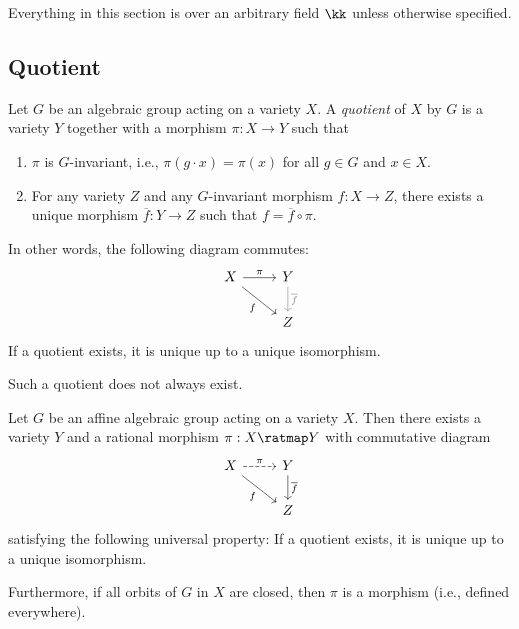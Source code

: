 Everything in this section is over an arbitrary field \(\kk\) unless otherwise specified.

\subsection{Quotient}

    \begin{definition}\label{def:quotient_of_variety_by_group_action}
        Let \(G\) be an algebraic group acting on a variety \(X\).
        A \emph{quotient} of \(X\) by \(G\) is a variety \(Y\) together with a morphism \(\pi: X \to Y\) such that
        \begin{enumerate}
            \item \(\pi\) is \(G\)-invariant, i.e., \(\pi(g \cdot x) = \pi(x)\) for all \(g \in G\) and \(x \in X\).
            \item For any variety \(Z\) and any \(G\)-invariant morphism \(f: X \to Z\), there exists a unique morphism \(\overline{f}: Y \to Z\) such that \(f = \overline{f} \circ \pi\).
        \end{enumerate}
        In other words, the following diagram commutes:
        \[
            \begin{tikzcd}
                X \arrow[r, "\pi"] \arrow[rd, "f"'] & Y \arrow[d, "\overline{f}", gray] \\
                & Z
            \end{tikzcd}
        \]
        If a quotient exists, it is unique up to a unique isomorphism.
    \end{definition}

    Such a quotient does not always exist.

    \begin{theorem}\label{thm:existence_of_quotient_by_algebraic_group}
        Let \(G\) be an affine algebraic group acting on a variety \(X\).
        Then there exists a variety \(Y\) and a rational morphism \(\pi: X \ratmap Y\) with commutative diagram
        \[
            \begin{tikzcd}
                X \arrow[r, dashed, "\pi"] \arrow[rd, "f"'] & Y \arrow[d, "\overline{f}"] \\
                & Z
            \end{tikzcd}
        \]
        satisfying the following universal property:
        If a quotient exists, it is unique up to a unique isomorphism.

        Furthermore, if all orbits of \(G\) in \(X\) are closed, then \(\pi\) is a morphism (i.e., defined everywhere).
    \end{theorem}


